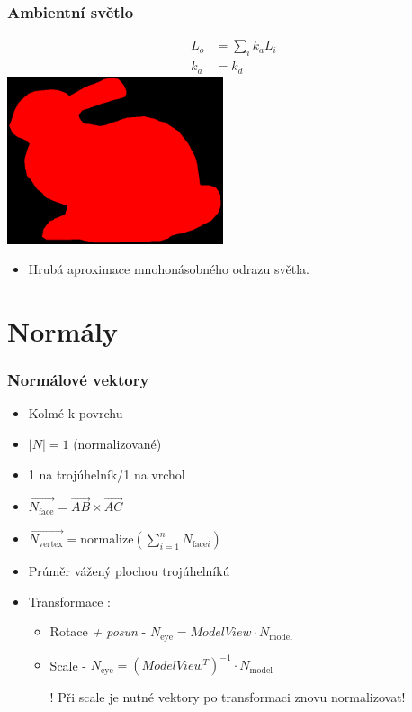 \begin{frame}
    \frametitle{Ambientní světlo}
    \begin{align*}
        L_o &= \sum_i k_a L_i \\
        k_a &= k_d 
    \end{align*}
    \vfill
    \includegraphics[width=2.5in]{pics/physicallyBasedRendering/ambient}
    \begin{itemize}
        \item Hrubá aproximace mnohonásobného odrazu světla.
    \end{itemize}
\end{frame}

\section{Normály}

\begin{frame}
    \frametitle{Normálové vektory}

    \begin{itemize}
        \item Kolmé k povrchu
        \item $\left| N \right| = 1$ (normalizované)
        \item 1 na trojúhelník/1 na vrchol
        \vfill
        \item $\displaystyle \vec{N_{\mathrm{face}}} = \vec{AB} \times \vec{AC}$
        \item $\displaystyle \vec{N_{\mathrm{vertex}}} = \mathrm{normalize}\left( \sum\limits_{i=1}^n N_{\mathrm{face}i} \right)$
        \item Prúměr vážený plochou trojúhelníkú
        \vfill
        \item Transformace :
        \begin{itemize}
            \item Rotace \emph{+ posun} - $N_{\mathrm{eye}} = ModelView \cdot N_{\mathrm{model}}$
            \item Scale - $N_{\mathrm{eye}} = (ModelView^T)^{-1} \cdot N_{\mathrm{model}}$
            \item[\color{red}!] Při scale je nutné vektory po transformaci znovu normalizovat!
        \end{itemize}
    \end{itemize}
\end{frame}

